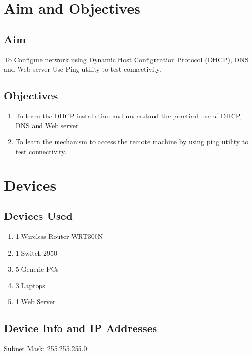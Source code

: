 \documentclass[11pt]{article}
\begin{document}
	
\tableofcontents
\thispagestyle{empty}
\clearpage


\setcounter{page}{1}

\section{Aim and Objectives}
\subsection*{Aim}
To Configure network using Dynamic Host Configuration Protocol (DHCP), DNS and Web server Use Ping utility to test connectivity.
\subsection*{Objectives}
\begin{enumerate}
	\item To learn the DHCP installation and understand the practical use of DHCP, DNS and Web server.
	\item To learn the mechanism to access the remote machine by using ping utility to test connectivity.
\end{enumerate}
\section{Devices}

\subsection{Devices Used}
\begin{enumerate}
	\item 1 Wireless Router WRT300N
	\item 1 Switch 2950
	\item 5 Generic PCs
	\item 3 Laptops
	\item 1 Web Server
\end{enumerate}

\subsection{Device Info and IP Addresses}

Subnet Mask: 255.255.255.0
\end{document}
